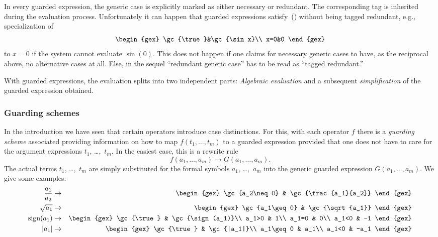 In every guarded expression, the generic case is explicitly marked as
either necessary or redundant. The corresponding tag is inherited
during the evaluation process. Unfortunately it can happen that
guarded expressions satisfy~() without being tagged
redundant, e.g., specialization of
\[
\begin{gex}
\gc{\true}&\gc{\sin x}\\
x=0&0
\end{gex}
\]
to $x=0$ if the system cannot evaluate $\sin(0)$. This does not happen
if one claims for necessary generic cases to have, as the reciprocal
above, no alternative cases at all. Else, in the sequel ``redundant
generic case'' has to be read as ``tagged redundant.''

With guarded expressions, the evaluation splits into two independent
parts: {\em Algebraic evaluation} and a subsequent {\em
simplification} of the guarded expression obtained.
%
\subsubsection{Guarding schemes}
In the introduction we have seen that certain operators introduce case
distinctions. For this, with each operator $f$ there is a {\em
guarding scheme} associated providing information on how to map
$f(t_1,\ldots,t_m)$ to a guarded expression provided that one does not
have to care for the argument expressions $t_1$, \dots,~$t_m$. In the
easiest case, this is a rewrite rule
\[
f(a_1,\ldots,a_m)\to G(a_1,\ldots,a_m).
\]
The actual terms $t_1$, \dots,~$t_m$ are simply substituted for the
formal symbols $a_1$, \dots,~$a_m$ into the generic guarded expression
$G(a_1,\ldots,a_m)$. We give some examples:
\begin{eqnarray}
\frac{a_1}{a_2} & \to &
\begin{gex}
\gc{a_2\neq 0} & \gc{\frac{a_1}{a_2}}
\end{gex}\nonumber\\
\sqrt{a_1} & \to &
\begin{gex}
\gc{a_1\geq 0} & \gc{\sqrt{a_1}}
\end{gex}\nonumber\\
\sign(a_1) & \to &
\begin{gex}
\gc{\true} & \gc{\sign(a_1)}\\
a_1>0 & 1\\
a_1=0 & 0\\
a_1<0 & -1
\end{gex}\nonumber\\
|a_1| & \to &
\begin{gex}
\gc{\true} & \gc{|a_1|}\\
a_1\geq0 & a_1\\
a_1<0 & -a_1
\end{gex}\label{absrewrite}
\end{eqnarray}

